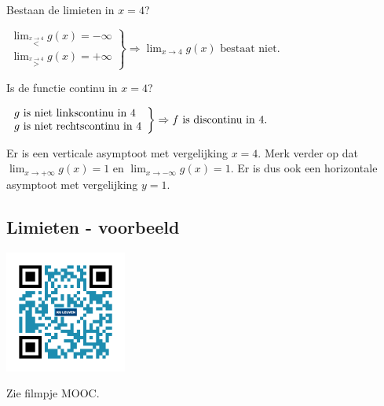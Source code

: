 \begin{voorbeeld}
	\ \\

Bestaan de limieten in $x=4$?

\begin{math}
\left. \begin{array}{l}
\lim_{\overset{x\rightarrow4}{<}}g(x)=-\infty \\
 \lim_{\overset{x\rightarrow4}{>}}g(x)=+\infty
\end{array}
\right\}
\Rightarrow \lim_{x\to4}g(x) \text{ bestaat niet}.
\end{math}

Is de functie continu in $x=4$?

\begin{math}
\centering
\left. \begin{array}{l}
g \text{ is niet linkscontinu in }4\\
g \text{ is niet rechtscontinu in }4
\end{array}
\right\}
\Rightarrow f \text{ is discontinu in }4.
\end{math}

Er is een verticale asymptoot met vergelijking $x=4$.
Merk verder op dat $\lim_{x\rightarrow+\infty}g(x)=1$ en $\lim_{x\rightarrow-\infty}g(x)=1$.
Er is dus ook een horizontale asymptoot met vergelijking $y=1$.

\end{voorbeeld}

\subsection{Limieten - voorbeeld}

\begin{minipage}{.25\linewidth}
	\raggedright
	\includegraphics[width=4cm]{2_elem_rekenvaardigheden_B/inputs/QR_Code_LIMIETENVOORBEELD_module2}
\end{minipage}
\begin{minipage}{.7\linewidth}
	Zie filmpje MOOC.
\end{minipage}

